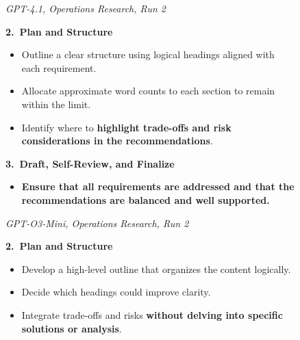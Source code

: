 \begin{figure}[H]
\centering

\begin{minipage}[t]{0.485\textwidth}
\begin{tcolorbox}[
    enhanced,
    equal height group=or-assistance,
    colback=green!3,
    colframe=green!45!black,
    colbacktitle=green!45!black,
    coltitle=white,
    fonttitle=\bfseries\small,
    title={Higher-Ranked Assistance Text},
    boxrule=0.5pt,
    arc=2pt,
    left=6pt,
    right=6pt,
    top=5pt,
    bottom=5pt
]
\raggedright
\small
\textit{GPT-4.1, Operations Research, Run 2}

\medskip
\textbf{2.\ Plan and Structure}
\begin{itemize}
    \setlength{\itemsep}{3pt}
    \setlength{\parskip}{0pt}
    \item Outline a clear structure using logical headings aligned with each
    requirement.
    \item Allocate approximate word counts to each section to remain within
    the limit.
    \item Identify where to \textbf{highlight trade-offs and risk
    considerations in the recommendations}.
\end{itemize}

\textbf{3.\ Draft, Self-Review, and Finalize}
\begin{itemize}
    \setlength{\itemsep}{3pt}
    \setlength{\parskip}{0pt}
    \item \textbf{Ensure that all requirements are addressed and that the
    recommendations are balanced and well supported.}
\end{itemize}
\end{tcolorbox}
\end{minipage}
\hfill
\begin{minipage}[t]{0.485\textwidth}
\begin{tcolorbox}[
    enhanced,
    equal height group=or-assistance,
    colback=red!3,
    colframe=red!45!black,
    colbacktitle=red!45!black,
    coltitle=white,
    fonttitle=\bfseries\small,
    title={Lower-Ranked Assistance Text},
    boxrule=0.5pt,
    arc=2pt,
    left=6pt,
    right=6pt,
    top=5pt,
    bottom=5pt
]
\raggedright
\small
\textit{GPT-O3-Mini, Operations Research, Run 2}

\medskip
\textbf{2.\ Plan and Structure}
\begin{itemize}
    \setlength{\itemsep}{3pt}
    \setlength{\parskip}{0pt}
    \item Develop a high-level outline that organizes the content logically.
    \item Decide which headings could improve clarity.
    \item Integrate trade-offs and risks \textbf{without delving into specific
    solutions or analysis}.
\end{itemize}


\end{tcolorbox}
\end{minipage}
\end{figure}

